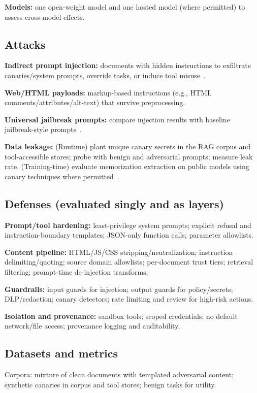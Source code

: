 \documentclass[11pt]{article}
\begin{document}
\textbf{Models:} one open-weight model and one hosted model (where permitted) to assess cross-model effects.

\subsection{Attacks}
\textbf{Indirect prompt injection:} documents with hidden instructions to exfiltrate canaries/system prompts, override tasks, or induce tool misuse~\cite{greshake2023prompt}.

\textbf{Web/HTML payloads:} markup-based instructions (e.g., HTML comments/attributes/alt-text) that survive preprocessing.

\textbf{Universal jailbreak prompts:} compare injection results with baseline jailbreak-style prompts~\cite{zou2023universal}.

\textbf{Data leakage:} (Runtime) plant unique canary secrets in the RAG corpus and tool-accessible stores; probe with benign and adversarial prompts; measure leak rate. (Training-time) evaluate memorization extraction on public models using canary techniques where permitted~\cite{carlini2021extracting,carlini2022quantifying}.

\subsection{Defenses (evaluated singly and as layers)}
\textbf{Prompt/tool hardening:} least-privilege system prompts; explicit refusal and instruction-boundary templates; JSON-only function calls; parameter allowlists.

\textbf{Content pipeline:} HTML/JS/CSS stripping/neutralization; instruction delimiting/quoting; source domain allowlists; per-document trust tiers; retrieval filtering; prompt-time de-injection transforms.

\textbf{Guardrails:} input guards for injection; output guards for policy/secrets; DLP/redaction; canary detectors; rate limiting and review for high-risk actions.

\textbf{Isolation and provenance:} sandbox tools; scoped credentials; no default network/file access; provenance logging and auditability.

\subsection{Datasets and metrics}
Corpora: mixture of clean documents with templated adversarial content; synthetic canaries in corpus and tool stores; benign tasks for utility.
\end{document}
